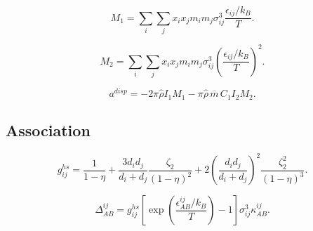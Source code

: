 \documentclass[11pt]{article}
\begin{document}
\begin{equation}
M_1=\sum_i\sum_j x_ix_jm_im_j\sigma_{ij}^3
\frac{\epsilon_{ij}/k_B}{T}.
\label{eq:dispersion_first_moment}
\end{equation}

\begin{equation}
M_2=\sum_i\sum_j x_ix_jm_im_j\sigma_{ij}^3
\left(\frac{\epsilon_{ij}/k_B}{T}\right)^2.
\label{eq:dispersion_second_moment}
\end{equation}

\begin{equation}
a^{disp}=-2\pi\widehat{\rho}I_1M_1
-\pi\widehat{\rho}\,\overline m\,C_1I_2M_2.
\label{eq:dispersion_helmholtz}
\end{equation}

\subsection{Association}

\begin{equation}
g_{ij}^{hs}=
\frac{1}{1-\eta}
+\frac{3d_id_j}{d_i+d_j}\frac{\zeta_2}{(1-\eta)^2}
+2\left(\frac{d_id_j}{d_i+d_j}\right)^2
\frac{\zeta_2^2}{(1-\eta)^3}.
\label{eq:association_contact}
\end{equation}

\begin{equation}
\Delta_{AB}^{ij}=g_{ij}^{hs}
\left[\exp\left(\frac{\epsilon_{AB}^{ij}/k_B}{T}\right)-1\right]
\sigma_{ij}^3\kappa_{AB}^{ij}.
\label{eq:association_strength}
\end{equation}
\end{document}
